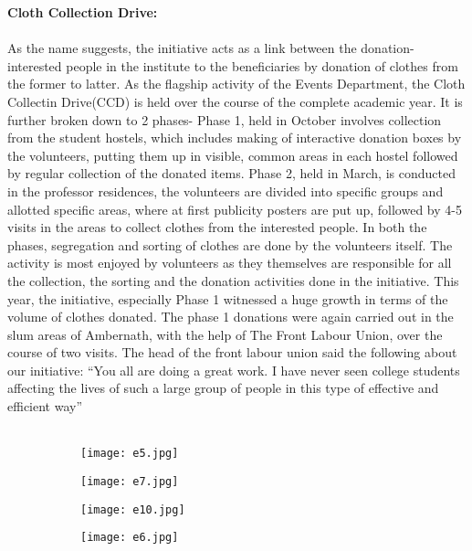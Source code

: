 \noindent \textbf {\Large \linebreak Cloth Collection Drive:}\\ \\As the name suggests, the initiative acts as a link between the donation-interested people in the institute to the beneficiaries by donation of clothes from the former to latter. As the flagship activity of the Events Department, the Cloth Collectin Drive(CCD) is held over the course of the complete academic year. It is further broken down to 2 phases- Phase 1, held in October involves collection from the student hostels, which includes making of interactive donation boxes by the volunteers, putting them up in visible, common areas in each hostel followed by regular collection of the donated items. Phase 2, held in March, is conducted in the professor residences, the volunteers are divided into specific groups and allotted specific areas, where at first publicity posters are put up, followed by 4-5 visits in the areas to collect clothes from the interested people. In both the phases, segregation and sorting of clothes are done by the volunteers itself. The activity is most enjoyed by volunteers as they themselves are responsible for all the collection, the sorting and the donation activities done in the initiative. This year, the initiative, especially Phase 1 witnessed a huge growth in terms of the volume of clothes donated. The phase 1 donations were again carried out in the slum areas of Ambernath, with the help of The Front Labour Union, over the course of two visits. The head of the front labour union said the following about our initiative:
\linebreak
\linebreak
“You all are doing a great work. I have never seen college students affecting the lives of such a large group of people in this type of effective and efficient way”
\\ \\
\begin{figure}[H]
\centering
\begin{subfigure}{.5\textwidth}
 \centering
 \texttt{[image: e5.jpg]}
\end{subfigure}%
\begin{subfigure}{.5\textwidth}
\texttt{[image: e7.jpg]}
\end{subfigure}
\end{figure}

\begin{figure}[H]
\centering
\begin{subfigure}{.5\textwidth}
 \centering
 \texttt{[image: e10.jpg]}
\end{subfigure}%
\begin{subfigure}{.5\textwidth}
\texttt{[image: e6.jpg]}
\end{subfigure}
\end{figure}

